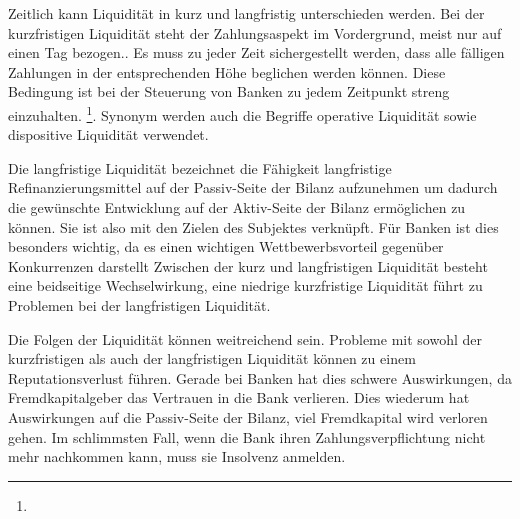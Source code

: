 Zeitlich kann Liquidität in kurz und langfristig unterschieden werden. Bei der kurzfristigen Liquidität steht der Zahlungsaspekt im Vordergrund, meist nur auf einen Tag bezogen.. Es muss zu jeder Zeit sichergestellt werden, dass alle fälligen Zahlungen in der entsprechenden Höhe beglichen werden können. Diese Bedingung ist bei der Steuerung von Banken zu jedem Zeitpunkt streng einzuhalten. \footnote{ }. Synonym werden auch die Begriffe operative Liquidität sowie dispositive Liquidität verwendet.

Die langfristige Liquidität bezeichnet die Fähigkeit langfristige Refinanzierungsmittel auf der Passiv-Seite der Bilanz aufzunehmen um dadurch die gewünschte Entwicklung auf der Aktiv-Seite der Bilanz ermöglichen zu können. Sie ist also mit den Zielen des Subjektes verknüpft. Für Banken ist dies besonders wichtig, da es einen wichtigen Wettbewerbsvorteil gegenüber Konkurrenzen darstellt Zwischen der kurz und langfristigen Liquidität besteht eine beidseitige Wechselwirkung, eine niedrige kurzfristige Liquidität führt zu Problemen bei der langfristigen Liquidität.

Die Folgen der Liquidität können weitreichend sein. Probleme mit sowohl der kurzfristigen als auch der langfristigen Liquidität können zu einem Reputationsverlust führen. Gerade bei Banken hat dies schwere Auswirkungen, da Fremdkapitalgeber das Vertrauen in die Bank verlieren. Dies wiederum hat Auswirkungen auf die Passiv-Seite der Bilanz, viel Fremdkapital wird verloren gehen. Im schlimmsten Fall, wenn die Bank ihren Zahlungsverpflichtung nicht mehr nachkommen kann, muss sie Insolvenz anmelden.





